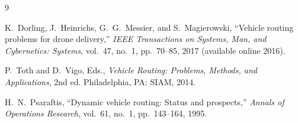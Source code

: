 \documentclass[11pt,a4paper]{article}
\begin{document}
\begin{thebibliography}{9}

K.~Dorling, J.~Heinrichs, G.~G.~Messier, and S.~Magierowski,
``Vehicle routing problems for drone delivery,''
\emph{IEEE Transactions on Systems, Man, and Cybernetics: Systems},
vol.~47, no.~1, pp.~70--85, 2017 (available online 2016).

P.~Toth and D.~Vigo, Eds.,
\emph{Vehicle Routing: Problems, Methods, and Applications}, 2nd ed.
Philadelphia, PA: SIAM, 2014.

H.~N.~Psaraftis,
``Dynamic vehicle routing: Status and prospects,''
\emph{Annals of Operations Research}, vol.~61, no.~1, pp.~143--164, 1995.

\end{thebibliography}
\end{document}
